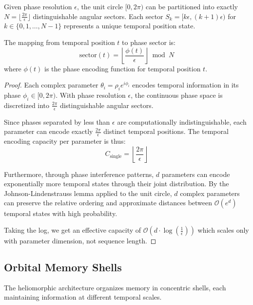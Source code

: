 \begin{lemma}
Given phase resolution $\epsilon$, the unit circle $[0, 2\pi)$ can be partitioned into exactly $N = \lfloor\frac{2\pi}{\epsilon}\rfloor$ distinguishable angular sectors. Each sector $S_k = [k\epsilon, (k+1)\epsilon)$ for $k \in \{0, 1, \ldots, N-1\}$ represents a unique temporal position state.

The mapping from temporal position $t$ to phase sector is:
\begin{equation}
\text{sector}(t) = \left\lfloor \frac{\phi(t)}{\epsilon} \right\rfloor \bmod N
\end{equation}
where $\phi(t)$ is the phase encoding function for temporal position $t$.
\end{lemma}

\begin{proof}
Each complex parameter $\theta_i = \rho_i e^{i\phi_i}$ encodes temporal information in its phase $\phi_i \in [0, 2\pi)$. With phase resolution $\epsilon$, the continuous phase space is discretized into $\frac{2\pi}{\epsilon}$ distinguishable angular sectors.

Since phases separated by less than $\epsilon$ are computationally indistinguishable, each parameter can encode exactly $\frac{2\pi}{\epsilon}$ distinct temporal positions. The temporal encoding capacity per parameter is thus:
\begin{equation}
C_{\text{single}} = \left\lfloor \frac{2\pi}{\epsilon} \right\rfloor
\end{equation}

Furthermore, through phase interference patterns, $d$ parameters can encode exponentially more temporal states through their joint distribution. By the Johnson-Lindenstrauss lemma applied to the unit circle, $d$ complex parameters can preserve the relative ordering and approximate distances between $\mathcal{O}(e^{d})$ temporal states with high probability.

Taking the log, we get an effective capacity of $\mathcal{O}(d \cdot \log(\frac{1}{\epsilon}))$ which scales only with parameter dimension, not sequence length.
\end{proof}

\subsection{Orbital Memory Shells}

The heliomorphic architecture organizes memory in concentric shells, each maintaining information at different temporal scales.

